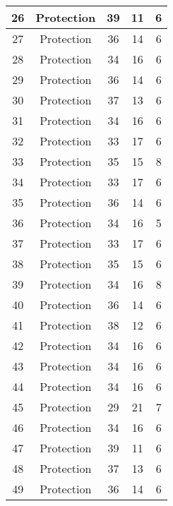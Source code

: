 \documentclass[results.tex]{subfiles}
\begin{document}
\begin{center}
\begin{tabular}{| c || c | c | c | c |}
    \hline
    26 & Protection & 39 & 11 & 6 \\ 
    \hline
    27 & Protection & 36 & 14 & 6 \\ 
    \hline
    28 & Protection & 34 & 16 & 6 \\ 
    \hline
    29 & Protection & 36 & 14 & 6 \\ 
    \hline
    30 & Protection & 37 & 13 & 6 \\ 
    \hline
    31 & Protection & 34 & 16 & 6 \\ 
    \hline
    32 & Protection & 33 & 17 & 6 \\ 
    \hline
    33 & Protection & 35 & 15 & 8 \\ 
    \hline
    34 & Protection & 33 & 17 & 6 \\ 
    \hline
    35 & Protection & 36 & 14 & 6 \\ 
    \hline
    36 & Protection & 34 & 16 & 5 \\ 
    \hline
    37 & Protection & 33 & 17 & 6 \\ 
    \hline
    38 & Protection & 35 & 15 & 6 \\ 
    \hline
    39 & Protection & 34 & 16 & 8 \\ 
    \hline
    40 & Protection & 36 & 14 & 6 \\ 
    \hline
    41 & Protection & 38 & 12 & 6 \\ 
    \hline
    42 & Protection & 34 & 16 & 6 \\ 
    \hline
    43 & Protection & 34 & 16 & 6 \\ 
    \hline
    44 & Protection & 34 & 16 & 6 \\ 
    \hline
    45 & Protection & 29 & 21 & 7 \\ 
    \hline
    46 & Protection & 34 & 16 & 6 \\ 
    \hline
    47 & Protection & 39 & 11 & 6 \\ 
    \hline
    48 & Protection & 37 & 13 & 6 \\ 
    \hline
    49 & Protection & 36 & 14 & 6 \\ 
    \hline   \end{tabular}
\end{center}
\end{document}
